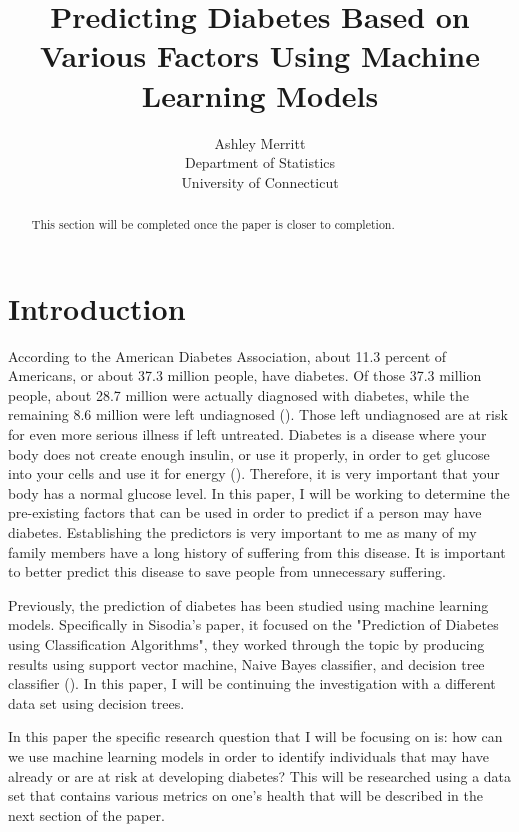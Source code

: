 \documentclass[12pt]{article}
\title{Predicting Diabetes Based on Various Factors Using Machine Learning Models}
\author{Ashley Merritt\\
    Department of Statistics\\
    University of Connecticut
    }
\begin{document}
\maketitle

\begin{abstract}
This section will be completed once the paper is closer to completion. 
\end{abstract}


\section{Introduction}
\label{sec:intro}
    According to the American Diabetes Association, about 11.3 percent of Americans, or about 37.3 million people, have diabetes.
    Of those 37.3 million people, about 28.7 million were actually diagnosed with diabetes, while the remaining 8.6 million were
    left undiagnosed (\citet{CDC2022Diabetes}). Those left undiagnosed are at risk for even more serious illness if left untreated. 
    Diabetes is a disease where your body does not create enough insulin, or use it properly, in order to get glucose into your cells 
    and use it for energy (\cite{NIH2023Whatis}). Therefore, it is very important that your body has a normal glucose level. In this 
    paper, I will be working to determine the pre-existing factors that can be used in order to predict if a person may have diabetes. 
    Establishing the predictors is very important to me as many of my family members have a long history of suffering from this disease. 
    It is important to better predict this disease to save people from unnecessary suffering. 

    Previously, the prediction of diabetes has been studied using machine learning models. Specifically in Sisodia's paper, it focused
    on the "Prediction of Diabetes using Classification Algorithms", they worked through the topic by producing results using support 
    vector machine, Naive Bayes classifier, and decision tree classifier (\cite{Sisodia2018Prediction}). In this paper, I will be 
    continuing the investigation with a different data set using decision trees.

    In this paper the specific research question that I will be focusing on is: how can we use machine learning models in order to identify 
    individuals that may have already or are at risk at developing diabetes? This will be researched using a data set that contains various 
    metrics on one's health that will be described in the next section of the paper.
\end{document}

